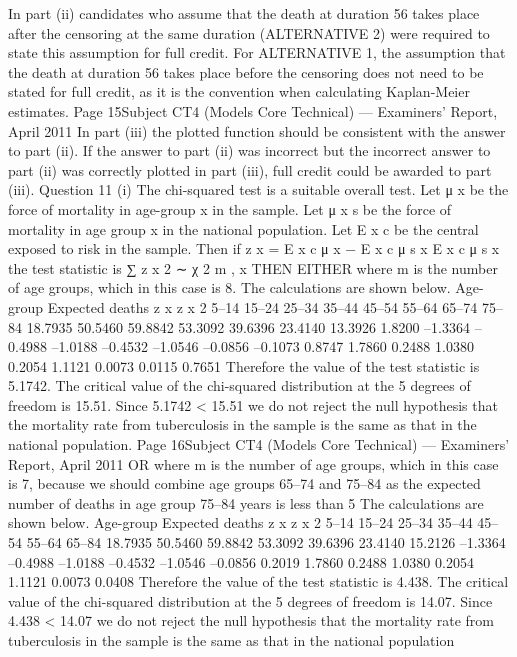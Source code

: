\documentclass[a4paper,12pt]{article}
\begin{document}
\begin{enumerate}
In part (ii) candidates who assume that the death at duration 56 takes place after the
censoring at the same duration (ALTERNATIVE 2) were required to state this assumption for
full credit. For ALTERNATIVE 1, the assumption that the death at duration 56 takes place
before the censoring does not need to be stated for full credit, as it is the convention when
calculating Kaplan-Meier estimates.
Page 15Subject CT4 (Models Core Technical) — Examiners’ Report, April 2011
In part (iii) the plotted function should be consistent with the answer to part (ii). If the
answer to part (ii) was incorrect but the incorrect answer to part (ii) was correctly plotted in
part (iii), full credit could be awarded to part (iii).
Question 11
(i)
The chi-squared test is a suitable overall test.
Let μ x be the force of mortality in age-group x in the sample.
Let μ x s be the force of mortality in age group x in the national population.
Let E x c be the central exposed to risk in the sample.
Then if z x =
E x c μ x − E x c μ s x
E x c μ s x
the test statistic is
∑ z x 2 ∼ χ 2 m ,
x
THEN EITHER
where m is the number of age groups, which in this case is 8.
The calculations are shown below.
Age-group Expected deaths z x z x 2
5–14
15–24
25–34
35–44
45–54
55–64
65–74
75–84 18.7935
50.5460
59.8842
53.3092
39.6396
23.4140
13.3926
1.8200 –1.3364
–0.4988
–1.0188
–0.4532
–1.0546
–0.0856
–0.1073
0.8747 1.7860
0.2488
1.0380
0.2054
1.1121
0.0073
0.0115
0.7651
Therefore the value of the test statistic is 5.1742.
The critical value of the chi-squared distribution at the 5%
degrees of freedom is 15.51.
Since 5.1742 < 15.51 we do not reject the null hypothesis that the mortality rate from
tuberculosis in the sample is the same as that in the national population.
Page 16Subject CT4 (Models Core Technical) — Examiners’ Report, April 2011
OR
where m is the number of age groups, which in this case is 7, because we should
combine age groups 65–74 and 75–84 as the expected number of deaths in age group
75–84 years is less than 5
The calculations are shown below.
Age-group Expected deaths z x z x 2
5–14
15–24
25–34
35–44
45–54
55–64
65–84 18.7935
50.5460
59.8842
53.3092
39.6396
23.4140
15.2126 –1.3364
–0.4988
–1.0188
–0.4532
–1.0546
–0.0856
0.2019 1.7860
0.2488
1.0380
0.2054
1.1121
0.0073
0.0408
Therefore the value of the test statistic is 4.438.
The critical value of the chi-squared distribution at the 5%
degrees of freedom is 14.07.
Since 4.438 < 14.07 we do not reject the null hypothesis that the mortality rate from
tuberculosis in the sample is the same as that in the national population

\end{enumerate}
\end{document}

